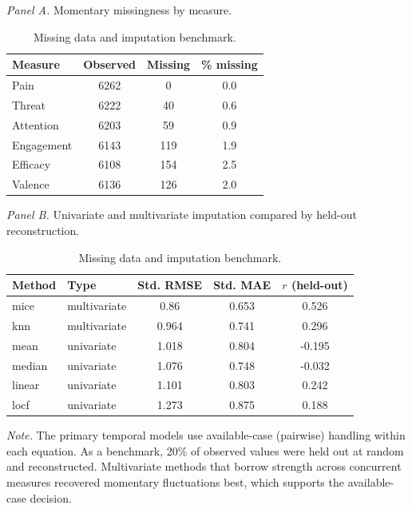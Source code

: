 \begin{table}[H]
\raggedright
\caption{Missing data and imputation benchmark.}
\label{tab:sup-imputation}
\footnotesize
\begingroup
\setlength{\tabcolsep}{4pt}
\renewcommand{\arraystretch}{1.08}
\noindent\textit{Panel A.} Momentary missingness by measure.\par\vspace{2pt}
\begin{tabular*}{\textwidth}{@{\extracolsep{\fill}}lccc@{}}
\toprule
Measure & Observed & Missing & \% missing \\
\midrule
Pain & 6262 & 0 & 0.0 \\
Threat & 6222 & 40 & 0.6 \\
Attention & 6203 & 59 & 0.9 \\
Engagement & 6143 & 119 & 1.9 \\
Efficacy & 6108 & 154 & 2.5 \\
Valence & 6136 & 126 & 2.0 \\
\bottomrule
\end{tabular*}
\par\vspace{6pt}\noindent\textit{Panel B.} Univariate and multivariate imputation compared by held-out reconstruction.\par\vspace{2pt}
\begin{tabular*}{\textwidth}{@{\extracolsep{\fill}}llccc@{}}
\toprule
Method & Type & Std. RMSE & Std. MAE & $r$ (held-out) \\
\midrule
mice & multivariate & 0.86 & 0.653 & 0.526 \\
knn & multivariate & 0.964 & 0.741 & 0.296 \\
mean & univariate & 1.018 & 0.804 & -0.195 \\
median & univariate & 1.076 & 0.748 & -0.032 \\
linear & univariate & 1.101 & 0.803 & 0.242 \\
locf & univariate & 1.273 & 0.875 & 0.188 \\
\bottomrule
\end{tabular*}
\par\vspace{3pt}\noindent\parbox{\textwidth}{\footnotesize\textit{Note.} The primary temporal models use available-case (pairwise) handling within each equation. As a benchmark, 20\% of observed values were held out at random and reconstructed. Multivariate methods that borrow strength across concurrent measures recovered momentary fluctuations best, which supports the available-case decision.}
\endgroup
\end{table}

